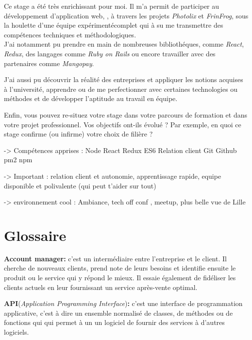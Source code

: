 \bigskip

Ce stage a été très enrichissant pour moi. Il m'a permit de participer
au développement d'application web, , à travers les projets
\emph{Photolix} et \emph{FrinFrog}, sous la houlette d'une équipe
expérimentécomplet qui à su me transmettre des compétences techniques et
méthodologiques.\\
J'ai notamment pu prendre en main de nombreuses bibliothéques, comme
\emph{React}, \emph{Redux}, des langages comme \emph{Ruby on Rails} ou
encore travailler avec des partenaires comme \emph{Mangopay}.

\bigskip

J'ai aussi pu découvrir la réalité des entreprises et appliquer les
notions acquises à l'université, apprendre ou de me perfectionner avec
certaines technologies ou méthodes et de développer l'aptitude au
travail en équipe.

\bigskip

Enfin, vous pouvez re-situez votre stage dans votre parcours de
formation et dans votre projet professionnel. Vos objectifs ont-ils
évolué ? Par exemple, en quoi ce stage confirme (ou infirme) votre choix
de filière ?

-\textgreater{} Compétences apprises : Node React Redux ES6 Relation
client Git Github pm2 npm

-\textgreater{} Important : relation client et autonomie, apprentissage
rapide, equipe disponible et polivalente (qui peut t'aider sur tout)

-\textgreater{} environnement cool : Ambiance, tech off conf , meetup,
plus belle vue de Lille

\newpage

\section{Glossaire}\label{glossaire}

\textbf{Account manager:} c'est un intermédiaire entre l'entreprise et
le client. Il cherche de nouveaux clients, prend note de leurs besoins
et identifie ensuite le produit ou le service qui y répond le mieux. Il
essaie également de fidéliser les clients actuels en leur fournissant un
service après-vente optimal.

\bigskip

\textbf{API}(\emph{Application Programming Interface})\textbf{:} c'est
une interface de programmation applicative, c'est à dire un ensemble
normalisé de classes, de méthodes ou de fonctions qui qui permet à un un
logiciel de fournir des services à d'autres logiciels.

